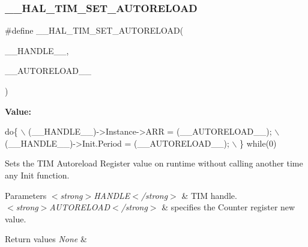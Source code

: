\subsubsection{\texorpdfstring{\+\_\+\+\_\+\+H\+A\+L\+\_\+\+T\+I\+M\+\_\+\+S\+E\+T\+\_\+\+A\+U\+T\+O\+R\+E\+L\+O\+AD}{\_\_HAL\_TIM\_SET\_AUTORELOAD}}
{\footnotesize\ttfamily \#define \+\_\+\+\_\+\+H\+A\+L\+\_\+\+T\+I\+M\+\_\+\+S\+E\+T\+\_\+\+A\+U\+T\+O\+R\+E\+L\+O\+AD(\begin{DoxyParamCaption}\item[{}]{\+\_\+\+\_\+\+H\+A\+N\+D\+L\+E\+\_\+\+\_\+,  }\item[{}]{\+\_\+\+\_\+\+A\+U\+T\+O\+R\+E\+L\+O\+A\+D\+\_\+\+\_\+ }\end{DoxyParamCaption})}

{\bfseries Value\+:}
\begin{DoxyCode}
\textcolor{keywordflow}{do}\{                                                    \(\backslash\)
                              (\_\_HANDLE\_\_)->Instance->ARR = (\_\_AUTORELOAD\_\_);  \(\backslash\)
                              (\_\_HANDLE\_\_)->Init.Period = (\_\_AUTORELOAD\_\_);    \(\backslash\)
                          \} \textcolor{keywordflow}{while}(0)
\end{DoxyCode}


Sets the T\+IM Autoreload Register value on runtime without calling another time any Init function. 


\begin{DoxyParams}{Parameters}
{\em $<$strong$>$\+H\+A\+N\+D\+L\+E$<$/strong$>$} & T\+IM handle. \\
\hline
{\em $<$strong$>$\+A\+U\+T\+O\+R\+E\+L\+O\+A\+D$<$/strong$>$} & specifies the Counter register new value. \\
\hline
\end{DoxyParams}

\begin{DoxyRetVals}{Return values}
{\em None} & \\
\hline
\end{DoxyRetVals}
\mbox{\label{group___t_i_m___exported___macros_gac5d6989516caa67fae23a9329228cdc7}} 
